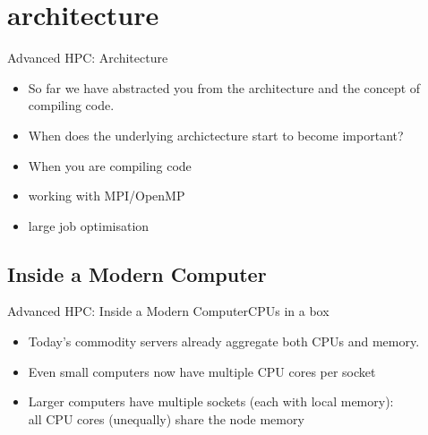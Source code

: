 \section{architecture}
\begin{frame}{Advanced HPC: Architecture}
\begin{itemize}
\item{So far we have abstracted you from the architecture and the concept of compiling code.}
\item{When does the underlying archictecture start to become important?}
\item{When you are compiling code}
\item{working with MPI/OpenMP}
\item{large job optimisation}
\end{itemize}
\end{frame}

\subsection{Inside a Modern Computer}
\begin{frame}{Advanced HPC: Inside a Modern Computer}{CPUs in a box}
\begin{itemize}
\item<2->{Today's commodity servers already aggregate both CPUs and memory.}
\item<3->{Even small computers now have multiple CPU cores per socket\hfill\\
}
\item<5->{Larger computers have multiple sockets (each with local memory):\hfill\\
{}\qquad all CPU cores (unequally) share the node memory\hfill\\
{}\qquad {}\\
{}\qquad {}\\
{}\qquad {}}
\end{itemize}
\end{frame}

